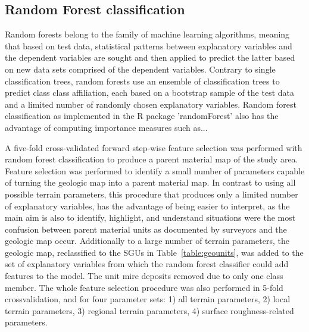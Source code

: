 \documentclass[preprint,12pt,authoryear]{elsarticle}
\begin{document}
\subsection{Random Forest classification }
Random forests \citep{Breiman2001} belong to the family of machine learning algorithms, meaning that based on test data, statistical patterns between explanatory variables and the dependent variables are sought and then applied to predict the latter based on new data sets comprised of the dependent variables. Contrary to single classification trees, random forests use an ensemble of classification trees to predict class class affiliation, each based on a bootstrap sample of the test data and a limited number of randomly chosen explanatory variables. Random forest classification as implemented in the R \citep{cran2014} package 'randomForest' also has the advantage of computing importance measures such as... 

A five-fold cross-validated forward step-wise feature selection was performed with random forest classification to produce a parent material map of the study area. Feature selection was performed to identify a small number of parameters capable of turning the geologic map into a parent material map. In contrast to using all possible terrain parameters, this procedure that produces only a limited number of explanatory variables, has the advantage of being easier to interpret, as the main aim is also to identify, highlight, and understand situations were the most confusion between parent material units as documented by surveyors and the geologic map occur. Additionally to a large number of terrain parameters, the geologic map, reclassified to the SGUs in Table~\ref{table:geounits}, was added to the set of explanatory variables from which the random forest classifier could add features to the model. The unit mire deposits removed due to only one class member. The whole feature selection procedure was also performed in 5-fold crossvalidation, and for four parameter sets: 1) all terrain parameters, 2) local terrain parameters, 3) regional terrain parameters, 4) surface roughness-related parameters.
\end{document}
